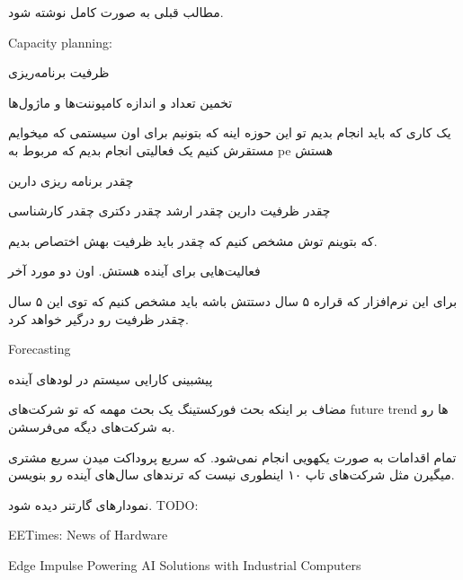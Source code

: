 مطالب قبلی به صورت کامل نوشته شود.

Capacity planning:

ظرفیت برنامه‌ریزی 

تخمین تعداد و اندازه کامپوننت‌ها و ماژول‌ها

یک کاری که باید انجام بدیم تو این حوزه اینه که بتونیم برای اون سیستمی که میخوایم
مستقرش کنیم یک فعالیتی انجام بدیم که مربوط به pe هستش 

چقدر برنامه ریزی دارین

چقدر ظرفیت دارین چقدر ارشد چقدر دکتری چقدر کارشناسی

که بتوینم توش مشخص کنیم که چقدر باید ظرفیت بهش اختصاص بدیم.

فعالیت‌هایی برای آینده هستش. اون دو مورد آخر

برای این نرم‌افزار که قراره ۵ سال دستتش باشه باید مشخص کنیم که توی این ۵ سال
چقدر ظرفیت رو درگیر خواهد کرد.

Forecasting

پیشبینی کارایی سیستم در لود‌های آینده

مضاف بر اینکه بحث فورکستینگ یک بحث مهمه که تو شرکت‌های future trend ها رو به
شرکت‌های دیگه می‌فرسشن.

تمام اقدامات به صورت یکهویی انجام نمی‌شود. که سریع پروداکت میدن سریع مشتری
میگیرن مثل شرکت‌های تاپ ۱۰ اینطوری نیست که ترند‌های سال‌های آینده رو بنویسن.

نمودار‌های گارتنر دیده شود. TODO:

EETimes: News of Hardware

Edge Impulse Powering AI Solutions with Industrial Computers
